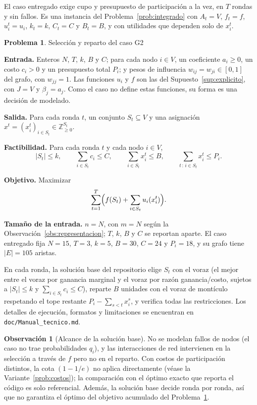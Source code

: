 \documentclass[11pt,a4paper]{article}
\theoremstyle{definition}
\newtheorem{problema}[definicion]{Problema}
\newtheorem{observacion}[definicion]{Observación}
\theoremstyle{plain}
\newcommand{\Z}{\mathbb{Z}}
\begin{document}
El caso entregado exige cupo y presupuesto de participación a la vez, en $T$
rondas y sin fallos. Es una instancia del Problema~\ref{prob:integrado} con
$A_t=V$, $f_t=f$, $u_i^t=u_i$, $k_t=k$, $C_t=C$ y $B_t=B$, y con utilidades que
dependen solo de $x_i^t$.

\begin{problema}\label{prob:caso} Selección y reparto del caso G2

\textbf{Entrada.} Enteros $N$, $T$, $k$, $B$ y $C$; para cada nodo $i\in V$, un
coeficiente $a_i\ge0$, un costo $c_i>0$ y un presupuesto total $P_i$; y pesos de
influencia $w_{ij}=w_{ji}\in[0,1]$ del grafo, con $w_{jj}=1$. Las funciones $u_i$
y $f$ son las del Supuesto~\ref{sup:explicito}, con $J=V$ y $\beta_j=a_j$. Como
el caso no define estas funciones, su forma es una decisión de modelado.

\textbf{Salida.} Para cada ronda $t$, un conjunto $S_t\subseteq V$ y una
asignación $x^t=(x_i^t)_{i\in S_t}\in\Z_{\ge0}^{S_t}$.

\textbf{Factibilidad.} Para cada ronda $t$ y cada nodo $i\in V$,
\[
  |S_t|\le k,
  \qquad
  \sum_{i\in S_t}c_i\le C,
  \qquad
  \sum_{i\in S_t}x_i^t\le B,
  \qquad
  \sum_{t\,:\,i\in S_t}x_i^t\le P_i.
\]

\textbf{Objetivo.} Maximizar
\[
  \sum_{t=1}^{T}\Bigl(f(S_t)+\sum_{i\in S_t}u_i(x_i^t)\Bigr).
\]

\textbf{Tamaño de la entrada.} $n=N$, con $m=N$ según la
Observación~\ref{obs:representacion}; $T$, $k$, $B$ y $C$ se reportan aparte. El
caso entregado fija $N=15$, $T=3$, $k=5$, $B=30$, $C=24$ y $P_i=18$, y su grafo
tiene $|E|=105$ aristas.
\end{problema}

En cada ronda, la solución base del repositorio elige $S_t$ con el voraz (el
mejor entre el voraz por ganancia marginal y el voraz por razón ganancia/costo,
sujetos a $|S_t|\le k$ y $\sum_{i\in S_t}c_i\le C$), reparte $B$ unidades con el
voraz de montículo respetando el tope restante $P_i-\sum_{s<t}x_i^s$, y verifica
todas las restricciones. Los detalles de ejecución, formatos y limitaciones se
encuentran en \texttt{doc/Manual\_tecnico.md}.

\begin{observacion}[Alcance de la solución base]
No se modelan fallos de nodos (el caso no trae probabilidades $q_i$), y las
interacciones de red intervienen en la selección a través de $f$ pero no en el
reparto. Con costos de participación distintos, la cota $(1-1/e)$ no aplica
directamente (véase la Variante~\ref{prob:costos}); la comparación con el óptimo
exacto que reporta el código es solo referencial. Además, la solución base decide
ronda por ronda, así que no garantiza el óptimo del objetivo acumulado del
Problema~\ref{prob:caso}.
\end{observacion}
\end{document}

